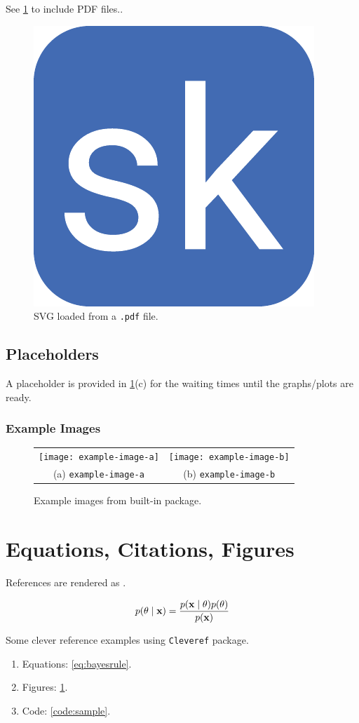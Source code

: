 \documentclass{article}
\begin{document}
See \cref{fig:svg_pdf} to include PDF files..

\begin{figure}[ht]
    \centering
	\includegraphics[width=0.15\linewidth]{favicon.pdf} 
    \caption{SVG loaded from a \texttt{.pdf} file.}
    \label{fig:svg_pdf}
\end{figure}    

\subsection{Placeholders}

A placeholder is provided in \cref{fig:svg_pdf}(c) for the waiting times until the graphs/plots are ready.

\subsubsection{Example Images}

\begin{figure}[!ht]
\centering
\begin{tabular}{cc}
    \texttt{[image: example-image-a]} & \texttt{[image: example-image-b]} \\
    (a) \texttt{example-image-a} & (b) \texttt{example-image-b}
\end{tabular}
\caption{Example images from built-in package.}
\label{fig:my_label}
\end{figure}

\section{Equations, Citations, Figures}

References are rendered as \citet{icml2021-vargp}.

\begin{align}
p(\theta \mid {\ensuremath{\boldsymbol{\mathbf{x}}}}) = \frac{p({\boldsymbol{\mathbf{x}}}\mid\theta)p(\theta)}{p({\boldsymbol{\mathbf{x}}})} \label{eq:bayesrule}
\end{align}

Some clever reference examples using \texttt{Cleveref} package.

\begin{enumerate}
\item Equations: \cref{eq:bayesrule}.
\item Figures: \cref{fig:svg_pdf}.
\item Code: \cref{code:sample}.
\end{enumerate}
\end{document}
